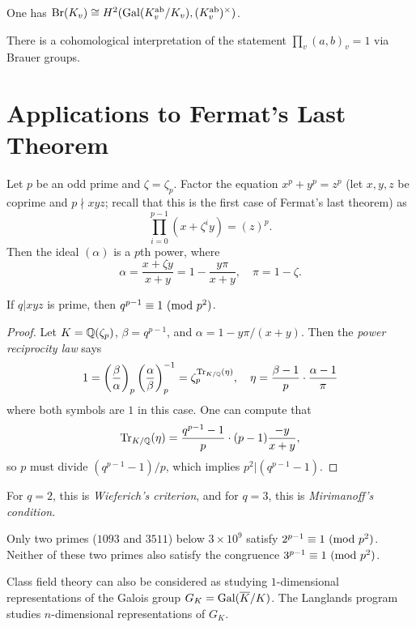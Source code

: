 \begin{remark}
  One has
  $\mathrm{Br}(K_v) \cong H^2(\operatorname{Gal}(K_v^\mathrm{ab} / K_v), (K_v^\mathrm{ab})^\times)$.
\end{remark}

\begin{remark}
  There is a cohomological interpretation
  of the statement $\prod_v (a, b)_v = 1$
  via Brauer groups.
\end{remark}

\section{Applications to Fermat's Last Theorem}

\begin{remark}
  Let $p$ be an odd prime and
  $\zeta = \zeta_p$. Factor the
  equation $x^p + y^p = z^p$ (let
  $x, y, z$ be coprime and $p \nmid xyz$;
  recall that this is the first case of
  Fermat's last theorem) as
  \[
    \prod_{i = 0}^{p - 1} (x + \zeta^i y)
    = (z)^p.
  \]
  Then the ideal $(\alpha)$ is a $p$th
  power, where
  \[
    \alpha = \frac{x + \zeta y}{x + y}
    = 1 - \frac{y\pi}{x + y}, \quad
    \pi = 1 - \zeta.
  \]
\end{remark}

\begin{theorem}
  If $q | xyz$ is prime, then
  $q^{p - 1} \equiv 1 \ (\mathrm{mod}\ p^2)$.
\end{theorem}

\begin{proof}
  Let $K = \mathbb{Q}(\zeta_p)$, $\beta = q^{p - 1}$,
  and $\alpha = 1 - y\pi / (x + y)$.
  Then the \emph{power reciprocity law}
  says
  \[
    1 = \left(\frac{\beta}{\alpha}\right)_p
    \left(\frac{\alpha}{\beta}\right)_p^{-1}
    = \zeta_p^{\operatorname{Tr}_{K / \mathbb{Q}}(\eta)},
    \quad \eta = \frac{\beta - 1}{p} \cdot \frac{\alpha - 1}{\pi}
  \]
  where both symbols are $1$ in this case.
  One can compute that
  \[
    \operatorname{Tr}_{K / \mathbb{Q}}(\eta)
    = \frac{q^{p - 1} - 1}{p} \cdot (p - 1)\frac{-y}{x + y},
  \]
  so $p$ must divide $(q^{p - 1} - 1) / p$,
  which implies $p^2 | (q^{p - 1} - 1)$.
\end{proof}

\begin{remark}
  For $q = 2$, this is
  \emph{Wieferich's criterion}, and
  for $q = 3$, this is
  \emph{Mirimanoff's condition}.
\end{remark}

\begin{remark}
  Only two primes ($1093$ and $3511$)
  below $3 \times 10^9$ satisfy
  $2^{p - 1} \equiv 1 \ (\mathrm{mod}\ p^2)$.
  Neither of these two primes also satisfy
  the congruence
  $3^{p - 1} \equiv 1 \ (\mathrm{mod}\ p^2)$.
\end{remark}

\begin{remark}
  Class field theory can also be
  considered as studying $1$-dimensional
  representations of the Galois group
  $G_K = \operatorname{Gal}(\overline{K} / K)$. The Langlands
  program studies $n$-dimensional
  representations of $G_K$.
\end{remark}
